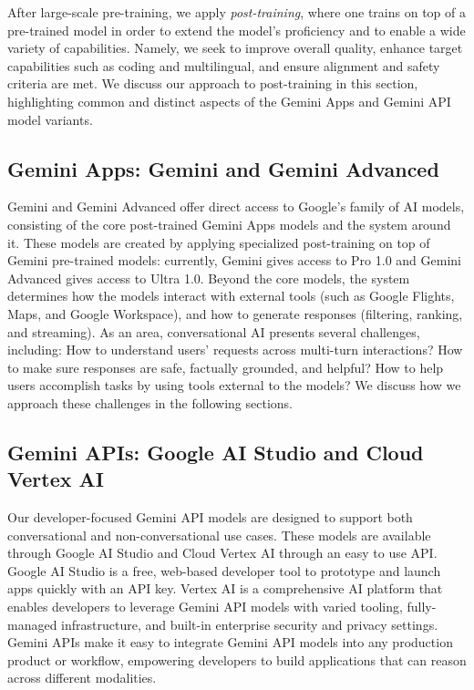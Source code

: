 \label{sec:post-training}

After large-scale pre-training, we apply \emph{post-training}, where one trains on top of a pre-trained model in order to extend the model’s proficiency and to enable a wide variety of capabilities. Namely, we seek to improve overall quality, enhance target capabilities such as coding and multilingual, and ensure alignment and safety criteria are met. We discuss our approach to post-training in this section, highlighting common and distinct aspects of the Gemini Apps and Gemini API model variants.

\subsection{Gemini Apps: Gemini and Gemini Advanced}

Gemini and Gemini Advanced offer direct access to Google's family of AI models, consisting of the core post-trained Gemini Apps models and the system around it. These models are created by applying specialized post-training on top of Gemini pre-trained models: currently, Gemini gives access to Pro 1.0 and Gemini Advanced gives access to Ultra 1.0. Beyond the core models, the system determines how the models interact with external tools (such as Google Flights, Maps, and Google Workspace), and how to generate responses (filtering, ranking, and streaming). As an area, conversational AI presents several challenges, including: How to understand users’ requests across multi-turn interactions? How to make sure responses are safe, factually grounded, and helpful? How to help users accomplish tasks by using tools external to the models? We discuss how we approach these challenges in the following sections.

\subsection{Gemini APIs: Google AI Studio and Cloud Vertex AI}

Our developer-focused Gemini API models are designed to support both conversational and non-conversational use cases. These models are available through Google AI Studio and Cloud Vertex AI through an easy to use API. Google AI Studio is a free, web-based developer tool to prototype and launch apps quickly with an API key. Vertex AI is a comprehensive AI platform that enables developers to leverage Gemini API models with varied tooling, fully-managed infrastructure, and built-in enterprise security and privacy settings. Gemini APIs make it easy to integrate Gemini API models into any production product or workflow, empowering developers to build applications that can reason across different modalities.


